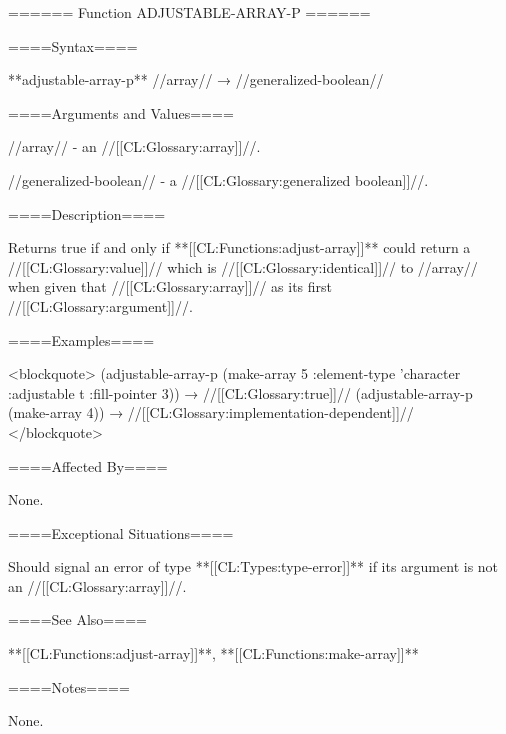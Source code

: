 ====== Function ADJUSTABLE-ARRAY-P ======

====Syntax====

**adjustable-array-p** //array// → //generalized-boolean//

====Arguments and Values====

//array// - an //[[CL:Glossary:array]]//.

//generalized-boolean// - a //[[CL:Glossary:generalized boolean]]//.

====Description====

Returns true if and only if **[[CL:Functions:adjust-array]]** could return a //[[CL:Glossary:value]]// which is //[[CL:Glossary:identical]]// to //array// when given that //[[CL:Glossary:array]]// as its first //[[CL:Glossary:argument]]//.

====Examples====

<blockquote> (adjustable-array-p (make-array 5 :element-type 'character :adjustable t :fill-pointer 3)) → //[[CL:Glossary:true]]// (adjustable-array-p (make-array 4)) → //[[CL:Glossary:implementation-dependent]]// </blockquote>

====Affected By====

None.

====Exceptional Situations====

Should signal an error of type **[[CL:Types:type-error]]** if its argument is not an //[[CL:Glossary:array]]//.

====See Also====

**[[CL:Functions:adjust-array]]**, **[[CL:Functions:make-array]]**

====Notes====

None.

